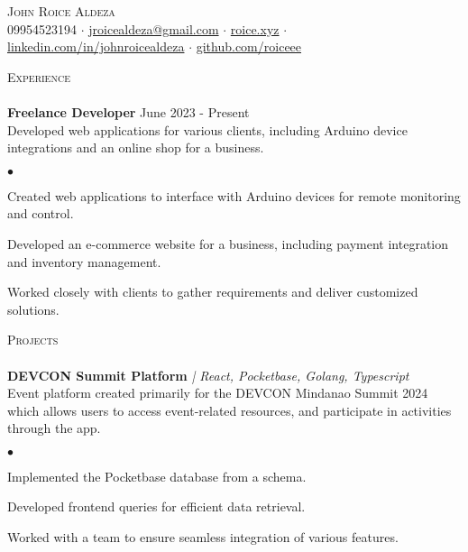 \documentclass[a4paper]{article}
\newcommand{\lineunder} {
        \vspace*{-8pt} \\
        \hspace*{-18pt} \hrulefill \\
    }
\newcommand{\header} [1] {
        {\vspace*{4mm} \hspace*{-18pt}\vspace*{8pt} \textsc{#1}}
        \vspace*{-6pt} \lineunder
    }
\newenvironment{achievements}{
        \begin{list}
            {$\bullet$}{\topsep 0pt \itemsep -2pt}}{\vspace*{4pt}
        \end{list}
    }
\begin{document}
    \vspace*{-40pt}

    \begin{center}
        {\Huge \scshape {John Roice Aldeza}}\\
        \vspace{2mm}
    09954523194 $\cdot$ \href{mailto:jroicealdeza@gmail.com}{jroicealdeza@gmail.com} $\cdot$ \href{https://roice.xyz}{roice.xyz} $\cdot$ \href{https://www.linkedin.com/in/johnroicealdeza}{linkedin.com/in/johnroicealdeza} $\cdot$ 
    \href{https://www.github.com/roiceee}{github.com/roiceee}
    \end{center}
    \vspace{-8pt}

    \header{Experience}

    {\textbf{Freelance Developer}} \hfill June 2023 - Present\\
    \vspace{1mm}
    Developed web applications for various clients, including Arduino device integrations and an online shop for a business.\\
    \begin{achievements}
        \item Created web applications to interface with Arduino devices for remote monitoring and control.
        \item Developed an e-commerce website for a business, including payment integration and inventory management.
        \item Worked closely with clients to gather requirements and deliver customized solutions.
    \end{achievements}
    \vspace*{3mm}
    \vspace{-8pt}
    
    \header{Projects}

    {\textbf{DEVCON Summit Platform}} {\sl | React, Pocketbase, Golang, Typescript} \hfill \\
    \vspace{1mm}
    Event platform created primarily for the DEVCON Mindanao Summit 2024 which allows users to access event-related resources, and participate in activities through the app.\\
    \begin{achievements}
        \item Implemented the Pocketbase database from a schema.
        \item Developed frontend queries for efficient data retrieval.
        \item Worked with a team to ensure seamless integration of various features.
    \end{achievements}
    \vspace*{3mm}
\end{document}
